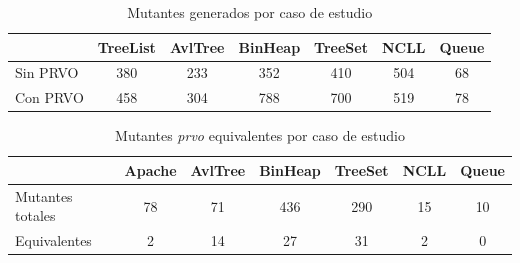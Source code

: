 \begin{table}[]
	\centering
	\begin{tabular}{l|cccccc|}
		\cline{2-7}
		& \multicolumn{1}{l}{TreeList} & \multicolumn{1}{l}{AvlTree} & \multicolumn{1}{l}{BinHeap} & \multicolumn{1}{l}{TreeSet} & \multicolumn{1}{l}{NCLL} & \multicolumn{1}{l|}{Queue} \\ \hline
		\multicolumn{1}{|l|}{Sin PRVO} & 380 & 233 & 352 & 410 & 504 & 68 \\ \cline{1-1}
		\multicolumn{1}{|l|}{Con PRVO} & 458 & 304 & 788 & 700 & 519 & 78 \\ \hline
	\end{tabular}
	\caption{Mutantes generados por caso de estudio}
	\label{tables.results.mutants}
\end{table}

\begin{table}[]
	\centering
	\begin{tabular}{l|cccccc|}
		\cline{2-7}
		& \multicolumn{1}{l}{Apache} & \multicolumn{1}{l}{AvlTree} & \multicolumn{1}{l}{BinHeap} & \multicolumn{1}{l}{TreeSet} & \multicolumn{1}{l}{NCLL} & \multicolumn{1}{l|}{Queue} \\ \hline
		\multicolumn{1}{|l|}{Mutantes totales} & 78 & 71 & 436 & 290 & 15 & 10 \\ \cline{1-1}
		\multicolumn{1}{|l|}{Equivalentes} & 2 & 14 & 27 & 31 & 2 & 0 \\ \hline
	\end{tabular}
	\caption{Mutantes \emph{prvo} equivalentes por caso de estudio}
	\label{tables.results.equivalents}
\end{table}

